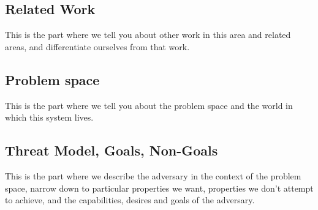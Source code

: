 \subsection{Related Work}
This is the part where we tell you about other work in this area and related
areas, and differentiate ourselves from that work.
 
\subsection{Problem space}
This is the part where we tell you about the problem space and the world in which
this system lives.

\subsection{Threat Model, Goals, Non-Goals}
This is the part where we describe the adversary in the context of the problem
space, narrow down to particular properties we want, properties we don't attempt
to achieve, and the capabilities, desires and goals of the adversary.

